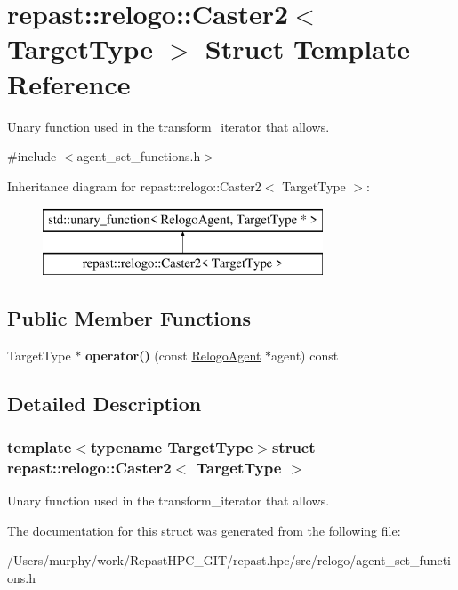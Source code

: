 \hypertarget{structrepast_1_1relogo_1_1_caster2}{\section{repast\-:\-:relogo\-:\-:Caster2$<$ Target\-Type $>$ Struct Template Reference}
\label{structrepast_1_1relogo_1_1_caster2}
}


Unary function used in the transform\-\_\-iterator that allows.  




{\ttfamily \#include $<$agent\-\_\-set\-\_\-functions.\-h$>$}

Inheritance diagram for repast\-:\-:relogo\-:\-:Caster2$<$ Target\-Type $>$\-:\begin{figure}[H]
\begin{center}
\leavevmode
\includegraphics[height=2.000000cm]{structrepast_1_1relogo_1_1_caster2}
\end{center}
\end{figure}
\subsection*{Public Member Functions}
\begin{DoxyCompactItemize}
\item 
\hypertarget{structrepast_1_1relogo_1_1_caster2_ae50fa843df761aaba14938ce189ad995}{Target\-Type $\ast$ {\bfseries operator()} (const \hyperlink{classrepast_1_1relogo_1_1_relogo_agent}{Relogo\-Agent} $\ast$agent) const }\label{structrepast_1_1relogo_1_1_caster2_ae50fa843df761aaba14938ce189ad995}

\end{DoxyCompactItemize}


\subsection{Detailed Description}
\subsubsection*{template$<$typename Target\-Type$>$struct repast\-::relogo\-::\-Caster2$<$ Target\-Type $>$}

Unary function used in the transform\-\_\-iterator that allows. 

The documentation for this struct was generated from the following file\-:\begin{DoxyCompactItemize}
\item 
/\-Users/murphy/work/\-Repast\-H\-P\-C\-\_\-\-G\-I\-T/repast.\-hpc/src/relogo/agent\-\_\-set\-\_\-functions.\-h\end{DoxyCompactItemize}
